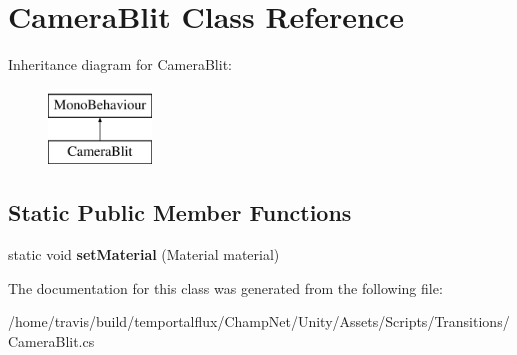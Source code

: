 \hypertarget{class_camera_blit}{\section{Camera\-Blit Class Reference}
\label{class_camera_blit}
}
Inheritance diagram for Camera\-Blit\-:\begin{figure}[H]
\begin{center}
\leavevmode
\includegraphics[height=2.000000cm]{class_camera_blit}
\end{center}
\end{figure}
\subsection*{Static Public Member Functions}
\begin{DoxyCompactItemize}
\item 
\hypertarget{class_camera_blit_a0d8bd77c40b169eac2ce9322d543d586}{static void {\bfseries set\-Material} (Material material)}\label{class_camera_blit_a0d8bd77c40b169eac2ce9322d543d586}

\end{DoxyCompactItemize}


The documentation for this class was generated from the following file\-:\begin{DoxyCompactItemize}
\item 
/home/travis/build/temportalflux/\-Champ\-Net/\-Unity/\-Assets/\-Scripts/\-Transitions/Camera\-Blit.\-cs\end{DoxyCompactItemize}
